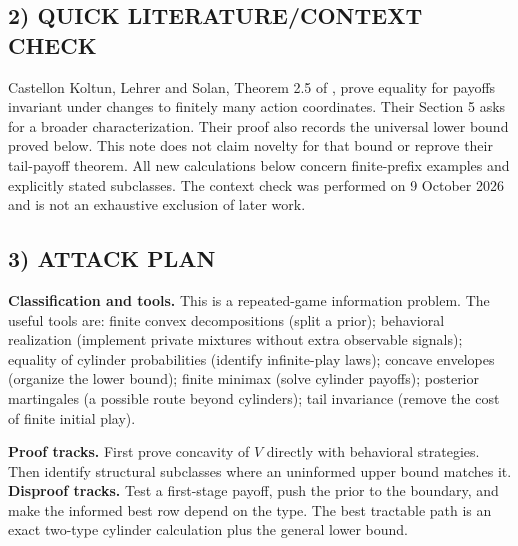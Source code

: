 \documentclass[11pt,a4paper]{article}
\theoremstyle{definition}
\theoremstyle{remark}
\begin{document}
\subsection*{2) QUICK LITERATURE/CONTEXT CHECK}
Castellon Koltun, Lehrer and Solan, Theorem 2.5 of \cite{tail}, prove equality for payoffs invariant under changes to finitely many action coordinates. Their Section 5 asks for a broader characterization. Their proof also records the universal lower bound proved below. This note does not claim novelty for that bound or reprove their tail-payoff theorem. All new calculations below concern finite-prefix examples and explicitly stated subclasses. The context check was performed on 9 October 2026 and is not an exhaustive exclusion of later work.

\subsection*{3) ATTACK PLAN}
\textbf{Classification and tools.} This is a repeated-game information problem. The useful tools are: finite convex decompositions (split a prior); behavioral realization (implement private mixtures without extra observable signals); equality of cylinder probabilities (identify infinite-play laws); concave envelopes (organize the lower bound); finite minimax (solve cylinder payoffs); posterior martingales (a possible route beyond cylinders); tail invariance (remove the cost of finite initial play).

\textbf{Proof tracks.} First prove concavity of $V$ directly with behavioral strategies. Then identify structural subclasses where an uninformed upper bound matches it. \textbf{Disproof tracks.} Test a first-stage payoff, push the prior to the boundary, and make the informed best row depend on the type. The best tractable path is an exact two-type cylinder calculation plus the general lower bound.
\end{document}

